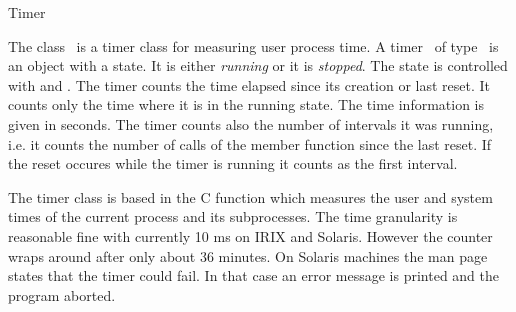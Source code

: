 
\begin{ccRefClass}{Timer}

\ccDefinition


The class \ccRefName\ is a timer class for measuring user process time.
A timer \ccVar\ of type \ccRefName\ is an object with a state. It is
either {\em running\/} or it is {\em stopped}. The state is controlled
with  and  . The timer counts the
time elapsed since its creation or last reset. It counts only the time
where it is in the running state. The time information is given in seconds.
The timer counts also the number of intervals it was running, i.e. it 
counts the number of calls of the  member function since the 
last reset. If the reset occures while the timer is running it counts as the
first interval.


\ccCreation

\ccPropagateThreeToTwoColumns


\ccOperations

\ccGlue
{}
\ccGlue
{}
\ccGlue
{}

\ccGlue
{} 
\ccGlue
{}
\ccGlue
{}


\ccImplementation

The timer class is based in the C function 
which measures the user and system times of the current process and
its subprocesses.  The time granularity is reasonable fine with
currently 10 ms on IRIX and Solaris. However the counter wraps around
after only about 36 minutes. On Solaris machines the man page states
that the timer could fail. In that case an error message is printed
and the program aborted.

\end{ccRefClass}
